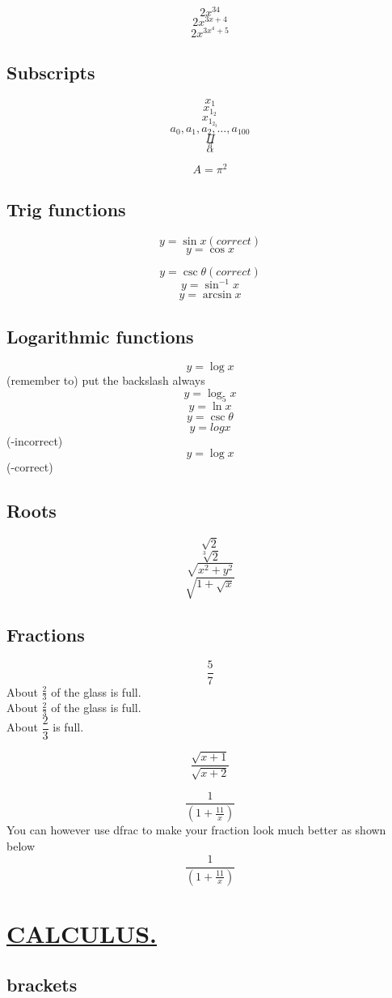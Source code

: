 \documentclass[a4paper,12pt]{article}
\begin{document}
	$$2x^{34}$$
	$$2x^{3x+4}$$
	$$2x^{3x^4+5}$$
	
	\subsection{Subscripts}
	
	$$x_1$$
	$$x_{1_{2}}$$
	$$x_{1_{2_3}}$$
	$$a_0,a_1,a_2,\ldots,a_{100}$$
	$$\Pi$$
	$$\pi$$
	$$\alpha$$
	
	$$A=\pi ^2$$
	
	\subsection{Trig  functions}
	$$y=\sin x(correct)$$
	$$y=\cos x$$
	
	$$y=\csc \theta(correct)$$
	$$y=\sin^{-1} x$$
	$$y=\arcsin x$$
	\subsection{Logarithmic functions}
	$$y=\log x$$(remember to) put the backslash always
	$$y=\log_5 x$$
	$$y=\ln x$$
   $$y=\csc \theta$$
   $$y=logx$$ (-incorrect)
	$$y=\log x$$ (-correct)
	
	\subsection{Roots}
	
	$$\sqrt{2}$$
	$$\sqrt[3]{2}$$
	$$\sqrt{x^2+y^2}$$
	$$\sqrt{1+\sqrt{x}}$$
	
	\subsection{Fractions}
	
	$$\frac{5}{7}$$
	About $\displaystyle \frac{2}{3}$ of the glass is full.\\[16pt]
	About $\frac{2}{3}$ of the glass is full.\\[6pt]
   About $\dfrac{2}{3}$ is full.
   
   $$\dfrac{\sqrt{x+1}}{\sqrt{x+2}}$$
  
  $$\frac{1}{   (1+\frac{11}{x})    }$$
   You can however use dfrac to make your fraction look much better as shown below
   $$\frac{1}{   (1+\frac{11}{x})    }$$
  \section{\underline{CALCULUS.}}
  \subsection{brackets}
\end{document}
